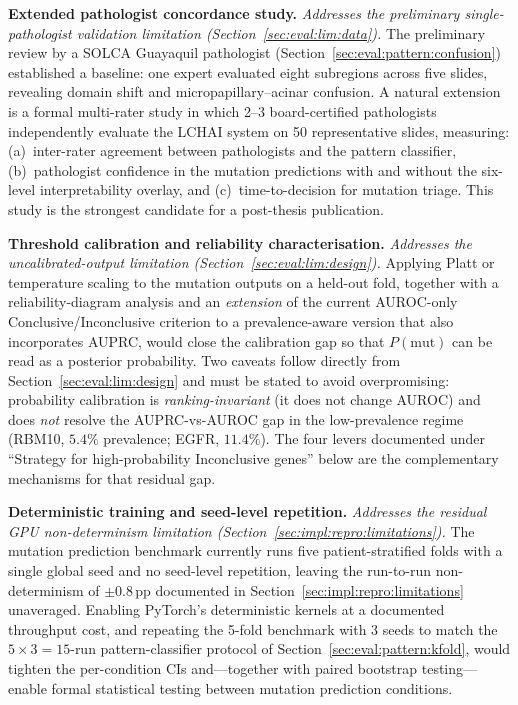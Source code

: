 \textbf{Extended pathologist concordance study.}
\emph{Addresses the preliminary single-pathologist validation
limitation (Section~\ref{sec:eval:lim:data}).}
The preliminary review by a SOLCA Guayaquil pathologist
(Section~\ref{sec:eval:pattern:confusion}) established a baseline:
one expert evaluated eight subregions across five slides, revealing
domain shift and micropapillary--acinar confusion.
A natural extension is a formal multi-rater study in which 2--3
board-certified pathologists independently evaluate the LCHAI system
on 50 representative slides, measuring: (a)~inter-rater agreement
between pathologists and the pattern classifier, (b)~pathologist
confidence in the mutation predictions with and without the
six-level interpretability overlay, and (c)~time-to-decision for
mutation triage.
This study is the strongest candidate for a post-thesis publication.

\textbf{Threshold calibration and reliability characterisation.}
\emph{Addresses the uncalibrated-output limitation
(Section~\ref{sec:eval:lim:design}).}
Applying Platt or temperature scaling to the mutation outputs on a
held-out fold, together with a reliability-diagram analysis and an
\emph{extension} of the current AUROC-only Conclusive/Inconclusive
criterion to a prevalence-aware version that also incorporates
AUPRC, would close the calibration gap so that $P(\text{mut})$
can be read as a posterior probability.
Two caveats follow directly from
Section~\ref{sec:eval:lim:design} and must be stated to avoid
overpromising: probability calibration is \emph{ranking-invariant}
(it does not change AUROC) and does \emph{not} resolve the
AUPRC-vs-AUROC gap in the low-prevalence regime
(RBM10, $5.4\%$ prevalence; EGFR, $11.4\%$).
The four levers documented under ``Strategy for high-probability
Inconclusive genes'' below are the complementary mechanisms for
that residual gap.

\textbf{Deterministic training and seed-level repetition.}
\emph{Addresses the residual GPU non-determinism limitation
(Section~\ref{sec:impl:repro:limitations}).}
The mutation prediction benchmark currently runs five
patient-stratified folds with a single global seed and no
seed-level repetition, leaving the run-to-run non-determinism
of $\pm 0.8$\,pp documented in
Section~\ref{sec:impl:repro:limitations} unaveraged.
Enabling PyTorch's deterministic kernels at a documented
throughput cost, and repeating the 5-fold benchmark with 3 seeds
to match the $5 \times 3 = 15$-run pattern-classifier protocol of
Section~\ref{sec:eval:pattern:kfold}, would tighten the
per-condition CIs and---together with paired bootstrap
testing---enable formal statistical testing between mutation
prediction conditions.


